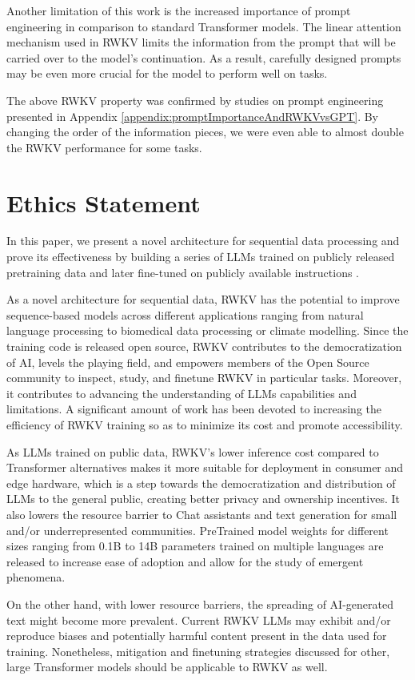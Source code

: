 Another limitation of this work is the increased importance of prompt engineering in comparison to standard Transformer models. The linear attention mechanism used in RWKV limits the information from the prompt that will be carried over to the model's continuation. As a result, carefully designed prompts may be even more crucial for the model to perform well on tasks.

The above RWKV property was confirmed by studies on prompt engineering presented in Appendix \ref{appendix:promptImportanceAndRWKVvsGPT}. By changing the order of the information pieces, we were even able to almost double the RWKV performance for some tasks. 

\section{Ethics Statement}

In this paper, we present a novel architecture for sequential data processing and prove its effectiveness by building a series of LLMs trained on publicly released pretraining data \cite{gao2020pile,biderman2022datasheet} and later fine-tuned on publicly available instructions \cite{alpaca, codealpaca, guanaco, gpt4all, sharegpt, Firefly, BELLE,belle2023exploring}.

As a novel architecture for sequential data, RWKV has the potential to improve sequence-based models across different applications ranging from natural language processing to biomedical data processing or climate modelling. Since the training code is released open source, RWKV contributes to the democratization of AI, levels the playing field, and empowers members of the Open Source community to inspect, study, and finetune RWKV in particular tasks. Moreover, it contributes to advancing the understanding of LLMs capabilities and limitations. A significant amount of work has been devoted to increasing the efficiency of RWKV training  so as to minimize its cost and promote accessibility.

As LLMs trained on public data, RWKV's lower inference cost compared to Transformer alternatives makes it more suitable for deployment in consumer and edge hardware, which is a step towards the democratization and distribution of LLMs to the general public, creating better privacy and ownership incentives. It also lowers the resource barrier to Chat assistants and text generation for small and/or underrepresented communities. PreTrained model weights for different sizes ranging from 0.1B to 14B parameters trained on multiple languages are released to increase ease of adoption and allow for the study of emergent phenomena. 

On the other hand, with lower resource barriers, the spreading of AI-generated text might become more prevalent. Current RWKV LLMs may exhibit and/or reproduce biases and potentially harmful content present in the data used for training. Nonetheless, mitigation and finetuning strategies discussed for other, large Transformer models should be applicable to RWKV as well. 


